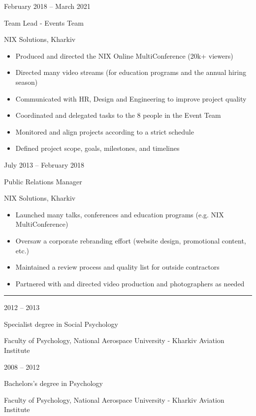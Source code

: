 \documentclass[a4paper,10pt]{article}
\newlength{\cvcolumngapwidth}
\newlength{\cvleftcolumnwidth}
\newlength{\cvrightcolumnwidth}
\newcommand{\cvsectionstyle}[1]{{\normalsize\cvsectionfont\textcolor{cvsectioncolor}{#1}}}
\newcommand{\cvtitlestyle}[1]{{\large\cvtitlefont\textcolor{cvtitlecolor}{#1}}}
\newcommand{\cvdurationstyle}[1]{{\small\cvdurationfont\textcolor{cvdurationcolor}{#1}}}
\newlength{\cvafteritemskipamount}
\newlength{\cvaftersectionskipamount}
\newlength{\cvaftertitleskipamount}
\newlength{\cvparskip}
\newcommand{\cvsection}[1]{
\begin{minipage}[t]{\cvleftcolumnwidth}
    \raggedleft\cvsectionstyle{#1}
\end{minipage}%
\hspace{\cvcolumngapwidth}%
\begin{minipage}[t]{\cvrightcolumnwidth}
    \textcolor{cvrulecolor}{\rule{\cvrightcolumnwidth}{0.3mm}}
\end{minipage}

\vspace{\cvaftersectionskipamount}
}
\newcommand{\cvitem}[2]{
\begin{minipage}[t]{\cvleftcolumnwidth}
    \raggedleft #1
\end{minipage}%
\hspace{\cvcolumngapwidth}%
\begin{minipage}[t]{\cvrightcolumnwidth}
    \setlength{\parskip}{\cvparskip} #2
\end{minipage}

\vspace{\cvafteritemskipamount}
}
\newcommand{\cvtitle}[1]{
\cvtitlestyle{#1}

\vspace{\cvaftertitleskipamount}
\vspace{-\cvparskip}
}
\begin{document}
\cvitem{
\cvdurationstyle{February 2018 -- March 2021}
}{
\cvtitle{Team Lead - Events Team}

NIX Solutions, Kharkiv

\begin{itemize}[leftmargin=*]
    \item Produced and directed the NIX Online MultiConference (20k+ viewers)
    \item Directed many video streams (for education programs and the annual hiring season) 
    \item Communicated with HR, Design and Engineering to improve project quality
    \item Coordinated and delegated tasks to the 8 people in the Event Team
    \item Monitored and align projects according to a strict schedule
    \item Defined project scope, goals, milestones, and timelines
\end{itemize}
}

\cvitem{
\cvdurationstyle{July 2013 -- February 2018}
}{
\cvtitle{Public Relations Manager}

NIX Solutions, Kharkiv

\begin{itemize}[leftmargin=*]
    \item Launched many talks, conferences and education programs (e.g. NIX MultiConference)
    \item Oversaw a corporate rebranding effort (website design, promotional content, etc.)
    \item Maintained a review process and quality list for outside contractors
    \item Partnered with and directed video production and photographers as needed
\end{itemize}
}



\cvsection{EDUCATION}

\cvitem{
\cvdurationstyle{2012 -- 2013}
}{
\cvtitle{Specialist degree in Social Psychology}

Faculty of Psychology, National Aerospace University - Kharkiv Aviation Institute
}

\cvitem{
\cvdurationstyle{2008 -- 2012}
}{
\cvtitle{Bachelors's degree in Psychology}

Faculty of Psychology, National Aerospace University - Kharkiv Aviation Institute
}
\end{document}
